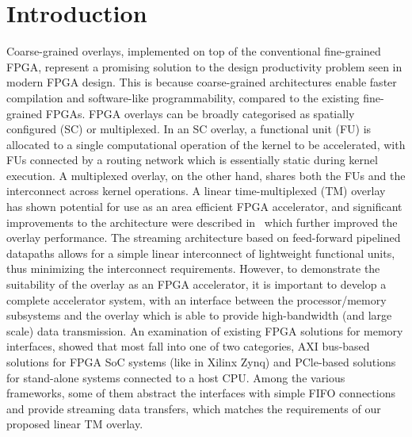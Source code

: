 \section{Introduction}
Coarse-grained overlays, implemented on top of the conventional fine-grained FPGA, represent a promising solution to the design productivity problem seen in modern FPGA design. This is because coarse-grained architectures enable faster compilation and software-like programmability, compared to the existing fine-grained FPGAs.  
FPGA overlays can be broadly categorised as spatially configured (SC) or multiplexed. In an SC overlay, a functional unit (FU) is allocated to a single computational operation of the kernel to be accelerated, with FUs connected by a routing network which is essentially static during kernel execution. A multiplexed overlay, on the other hand, shares both the FUs and the interconnect across kernel operations.
A linear time-multiplexed (TM) overlay~\cite{li2016area} has shown potential for use as an area efficient FPGA accelerator, and significant improvements to the architecture were described in~\cite{li2018time} which further improved the overlay performance. 
The streaming architecture based on feed-forward pipelined datapaths allows for a simple linear interconnect of lightweight functional units, thus minimizing the interconnect requirements. 
However, to demonstrate the suitability of the overlay as an FPGA accelerator, it is important to develop a complete accelerator system, with an interface between the processor/memory subsystems and the overlay which is able to provide high-bandwidth (and large scale) data transmission.
An examination of existing FPGA solutions for memory interfaces, showed that most fall into one of two categories, AXI bus-based solutions for FPGA SoC systems (like in Xilinx Zynq) and PCle-based solutions for stand-alone systems connected to a host CPU. 
Among the various frameworks, some of them abstract the interfaces with simple FIFO connections and provide streaming data transfers, which matches the requirements of our proposed linear TM overlay. 

